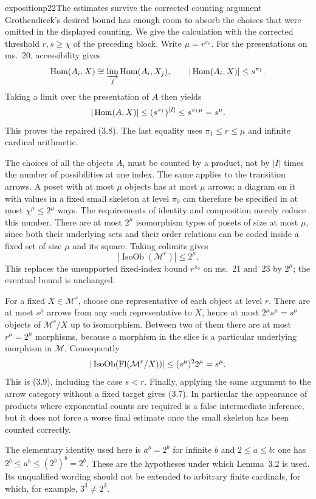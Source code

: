 \begin{dcomment}{exposition}{p22}{The estimates survive the corrected counting argument}
Grothendieck's desired bound has enough room to absorb the choices that were omitted in the displayed counting. We give the calculation with the corrected threshold $r,s\geq\chi$ of the preceding block. Write $\mu=r^{\pi_0}$. For the presentations on ms.~20, accessibility gives
\[
\operatorname{Hom}(A_i,X)\cong\varinjlim_j\operatorname{Hom}(A_i,X_j),
\qquad |\operatorname{Hom}(A_i,X)|\leq s^{\pi_1}.
\]
Taking a limit over the presentation of $A$ then yields
\[
|\operatorname{Hom}(A,X)|\leq (s^{\pi_1})^{|I|}
\leq s^{\pi_1\mu}=s^\mu.
\]
This proves the repaired (3.8). The last equality uses $\pi_1\leq r\leq\mu$ and infinite cardinal arithmetic.

The choices of all the objects $A_i$ must be counted by a product, not by $|I|$ times the number of possibilities at one index. The same applies to the transition arrows. A poset with at most $\mu$ objects has at most $\mu$ arrows; a diagram on it with values in a fixed small skeleton at level $\pi_0$ can therefore be specified in at most $\chi^\mu\leq 2^\mu$ ways. The requirements of identity and composition merely reduce this number. There are at most $2^\mu$ isomorphism types of posets of size at most $\mu$, since both their underlying sets and their order relations can be coded inside a fixed set of size $\mu$ and its square. Taking colimits gives
\[
|\operatorname{IsoOb}(\mathcal M^r)|\leq 2^\mu.
\]
This replaces the unsupported fixed-index bound $r^{\pi_0}$ on ms.~21 and~23 by $2^\mu$; the eventual bound is unchanged.

For a fixed $X\in\mathcal M^s$, choose one representative of each object at level $r$. There are at most $s^\mu$ arrows from any such representative to $X$, hence at most $2^\mu s^\mu=s^\mu$ objects of $\mathcal M^r/X$ up to isomorphism. Between two of them there are at most $r^\mu=2^\mu$ morphisms, because a morphism in the slice is a particular underlying morphism in $\mathcal M$. Consequently
\[
|\operatorname{IsoOb}(\mathrm{Fl}(\mathcal M^r/X))|
\leq(s^\mu)^2 2^\mu=s^\mu.
\]
This is (3.9), including the case $s<r$. Finally, applying the same argument to the arrow category without a fixed target gives (3.7). In particular the appearance of products where exponential counts are required is a false intermediate inference, but it does not force a worse final estimate once the small skeleton has been counted correctly.

The elementary identity used here is $a^b=2^b$ for infinite $b$ and $2\leq a\leq b$: one has $2^b\leq a^b\leq(2^b)^b=2^b$. These are the hypotheses under which Lemma~3.2 is used. Its unqualified wording should not be extended to arbitrary finite cardinals, for which, for example, $3^3\ne2^3$.
\end{dcomment}


